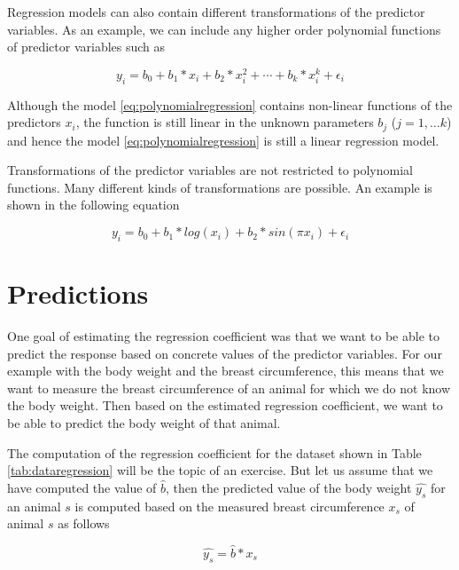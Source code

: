 \documentclass[]{book}
\theoremstyle{definition}
\theoremstyle{definition}
\theoremstyle{definition}
\theoremstyle{remark}
\begin{document}
Regression models can also contain different transformations of the predictor variables. As an example, we can include any higher order polynomial functions of predictor variables such as

\begin{equation}
  y_i = b_0 + b_1 * x_i + b_2 * x_i^2 + \cdots + b_k * x_i^k + \epsilon_i
  \label{eq:polynomialregression}
\end{equation}

Although the model \eqref{eq:polynomialregression} contains non-linear functions of the predictors \(x_i\), the function is still linear in the unknown parameters \(b_j\) (\(j = 1, \ldots k\)) and hence the model \eqref{eq:polynomialregression} is still a linear regression model.

Transformations of the predictor variables are not restricted to polynomial functions. Many different kinds of transformations are possible. An example is shown in the following equation

\begin{equation}
  y_i = b_0 + b_1 * log(x_i) + b_2 * sin(\pi x_i) + \epsilon_i
  \label{eq:generalregression}
\end{equation}

\hypertarget{asm-flem-prediction}{%
\section{Predictions}\label{asm-flem-prediction}}

One goal of estimating the regression coefficient was that we want to be able to predict the response based on concrete values of the predictor variables. For our example with the body weight and the breast circumference, this means that we want to measure the breast circumference of an animal for which we do not know the body weight. Then based on the estimated regression coefficient, we want to be able to predict the body weight of that animal.

The computation of the regression coefficient for the dataset shown in Table \ref{tab:dataregression} will be the topic of an exercise. But let us assume that we have computed the value of \(\hat{b}\), then the predicted value of the body weight \(\widehat{y_s}\) for an animal \(s\) is computed based on the measured breast circumference \(x_s\) of animal \(s\) as follows

\begin{equation}
  \widehat{y_s} = \hat{b} * x_s
  \label{eq:predictbwonbc}
\end{equation}
\end{document}
